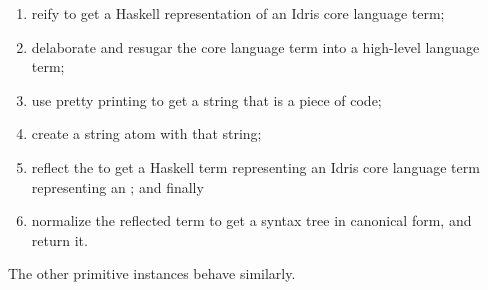 \begin{enumerate}
  \item reify  to get a Haskell representation of an Idris core language term;
  \item delaborate and resugar the core language term into a high-level language term;
  \item use pretty printing to get a string that is a piece of code;
  \item create a string atom \sexp{} with that string;
  \item reflect the \sexp{} to get a Haskell term representing an Idris core language term representing an \sexp{}; and finally
  \item normalize the reflected term to get a syntax tree in canonical form, and return it.
\end{enumerate}

\noindent
The other primitive instances behave similarly.

